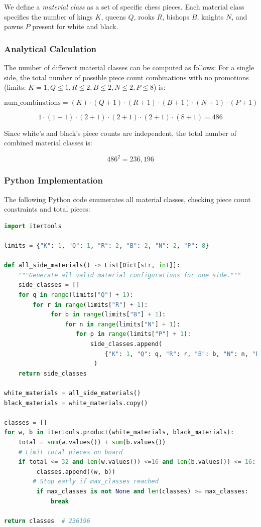 \documentclass[12pt]{article}
\begin{document}
We define a \emph{material class} as a set of specific chess pieces. Each material class specifies the number of kings $K$, queens $Q$, rooks $R$, bishops $B$, knights $N$, and pawns $P$ present for white and black.

\subsubsection{Analytical Calculation}

The number of different material classes can be computed as follows: 
For a single side, the total number of possible piece count combinations with no promotions 
(limits: $K = 1, Q \le 1, R \le 2, B \le 2, N \le 2, P \le 8$) is:

\[
\text{num\_combinations} = (K) \cdot (Q + 1) \cdot (R + 1) \cdot (B + 1) \cdot (N + 1) \cdot (P + 1)
\]

\[
1 \cdot (1 + 1) \cdot (2 + 1) \cdot (2 + 1) \cdot (2 + 1) \cdot (8 + 1) = 486
\]

Since white's and black's piece counts are independent, the total number of
combined material classes is:

\[
486^2 = 236{,}196
\]

\subsubsection{Python Implementation}

The following Python code enumerates all material classes, checking piece
count constraints and total pieces:

\begin{lstlisting}[language=Python, caption={Enumeration of all material classes in chess}, label={lst:material-classes}]
import itertools

limits = {"K": 1, "Q": 1, "R": 2, "B": 2, "N": 2, "P": 8}

def all_side_materials() -> List[Dict[str, int]]:
    """Generate all valid material configurations for one side."""
    side_classes = []
    for q in range(limits["Q"] + 1):
        for r in range(limits["R"] + 1):
             for b in range(limits["B"] + 1):
                 for n in range(limits["N"] + 1):
                    for p in range(limits["P"] + 1):
                        side_classes.append(
                            {"K": 1, "Q": q, "R": r, "B": b, "N": n, "P": p}
                         )
    return side_classes

white_materials = all_side_materials()
black_materials = white_materials.copy()

classes = []
for w, b in itertools.product(white_materials, black_materials):
    total = sum(w.values()) + sum(b.values())
    # Limit total pieces on board
    if total <= 32 and len(w.values()) <=16 and len(b.values()) <= 16:
         classes.append((w, b))
        # Stop early if max_classes reached
         if max_classes is not None and len(classes) >= max_classes:
             break

return classes  # 236196
\end{lstlisting}
\end{document}
